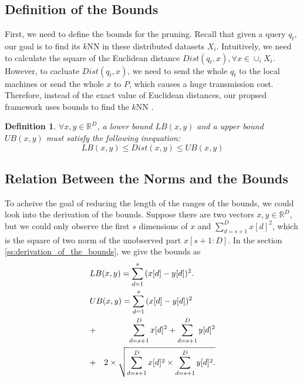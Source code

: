 
\subsection{Definition of the Bounds} %
\label{ss:definition_of_the_bounds}

First, we need to define the bounds for the pruning.  Recall that given a query $q_t$, our goal is to find its $k$NN in these distributed datasets $X_i$.  Intuitively, we need to calculate the square of the Euclidean distance $Dist(q_t,x), \forall x\in \cup_i X_i$.  However, to cacluate $Dist(q_t,x)$, we need to send the whole $q_t$ to the local machines or send the whole $x$ to $P$, which causes a huge transmission cost.  Therefore, instead of the exact value of Euclidean distances, our propsed framework uses bounds to find the $k$NN .

\newtheorem{Bounds}{\bf Definition}
\begin{Bounds}
$\forall x,y \in \mathbb{R}^D$, a lower bound $LB(x,y)$ and a upper bound $UB(x,y)$ must satisfy the following inequation:
\[
LB(x,y)\leq Dist(x,y) \leq UB(x,y)
\]
\end{Bounds}

\subsection{Relation Between the Norms and the Bounds} %
\label{sub:relation_between_the_norms_and_the_bounds}

To acheive the goal of reducing the length of the ranges of the bounds, we could look into the derivation of the bounds. Suppose there are two vectors $x,y\in \mathbb{R}^D$, but we could only observe the first $s$ dimensions of $x$ and $\sum^D_{d=s+1}{x[d]^2}$, which is the square of two norm of the unobserved part $x[s+1:D]$.  In the section \ref{ss:derivation_of_the_bounds}, we give the bounds as 
{
\begin{eqnarray*}
\lefteqn{LB(x,y) = \sum^s_{d=1}{(x[d]-y[d])^2}.} \label{eq:single-LB-tmp} \\
\lefteqn{UB(x,y) = \sum^s_{d=1}{(x[d]-y[d])^2}} \notag \\
& + & \sum^D_{d=s+1}{x[d]^2}+\sum^D_{d=s+1}{y[d]^2} \notag \\
& + & 2 \times \sqrt{\sum^D_{d=s+1}{x[d]^2}\times \sum^D_{d=s+1}{y[d]^2}.}\label{eq:single-UB-tmp}
\end{eqnarray*}
}

